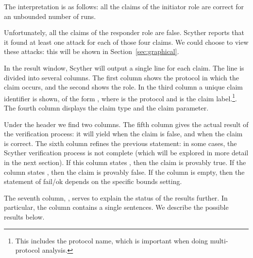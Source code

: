 \documentclass{book}
\begin{document}
The interpretation is as follows: all the claims of the initiator role
 are correct for an unbounded number of runs.

Unfortunately, all the claims of the responder role are false. Scyther
reports that it found at least one attack for each of those four claims.
We could choose to view these attacks: this will be shown in
Section~\ref{sec:graphical}.

In the result window, Scyther will output a single
line for each claim. The line is divided into several columns. The first
column shows the protocol in which the claim occurs, and the second
shows the role. In the third column a unique claim identifier is shown,
of the form , where  is the protocol and  is the
claim label.\footnote{This includes the protocol name, which is important when
doing multi-protocol analysis.}. The fourth column displays the claim
type and the claim parameter.

Under the header  we find two columns.
The fifth column gives the actual result of the verification process: it
will yield  when the claim is false, and  when the
claim is correct.
The sixth column refines the previous statement: in some cases, the
Scyther verification process is not complete (which will be explored in
more detail in the next section). If this column states ,
then the claim is provably true. If the column states ,
then the claim is provably false. If the column is empty, then the
statement of fail/ok depends on the specific bounds setting.

The seventh column, , serves to explain the status of the results
further. In particular, the column contains a single sentences. We
describe the possible results below.
\end{document}
